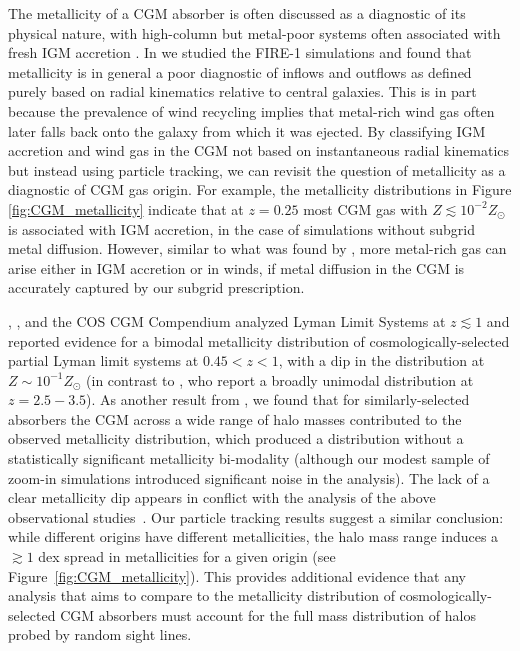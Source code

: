 \documentclass[fleqn,usenatbib]{mnras}
\begin{document}
The metallicity of a CGM absorber is often discussed as a diagnostic of its physical nature, with high-column but metal-poor systems often associated with fresh IGM accretion \citep[e.g.,][]{2011ApJ...743..207R, 2011Sci...334.1245F,Fumagalli2016a}. 
In \cite{Hafen2016} we studied the FIRE-1 simulations and found that metallicity is in general a poor diagnostic of inflows and outflows as defined purely based on radial kinematics relative to central galaxies. 
This is in part because the prevalence of wind recycling implies that metal-rich wind gas often later falls back onto the galaxy from which it was ejected. 
By classifying IGM accretion and wind gas in the CGM not based on instantaneous radial kinematics but instead using particle tracking, we can revisit the question of metallicity as a diagnostic of CGM gas origin. 
For example, the metallicity distributions in Figure \ref{fig:CGM_metallicity} indicate that at $z=0.25$ most CGM gas with $Z \lesssim 10^{-2}Z_\odot$ is associated with IGM accretion, in the case of simulations without subgrid metal diffusion. 
However, similar to what was found by \cite{Hafen2016}, more metal-rich gas can arise either in IGM accretion or in winds, if metal diffusion in the CGM is accurately captured by our subgrid prescription.

\cite{Lehner2013}, \cite{Wotta2016}, and the COS CGM Compendium \citep{Lehner2018,Wotta2018,Lehner2019} analyzed Lyman Limit Systems at $z \lesssim 1$ and reported evidence for a bimodal metallicity distribution of cosmologically-selected partial Lyman limit systems at $0.45 < z < 1$, with a dip in the distribution at $Z\sim10^{-1}Z_\odot$ (in contrast to \citealt{Fumagalli2016}, who report a broadly unimodal distribution at $z=2.5-3.5$).
As another result from \cite{Hafen2016}, we found that for similarly-selected absorbers the CGM across a wide range of halo masses contributed to the observed metallicity distribution, which produced a distribution without a statistically significant metallicity bi-modality (although our modest sample of zoom-in simulations introduced significant noise in the analysis). 
The lack of a clear metallicity dip appears in conflict with the analysis of the above observational studies~\citep[see also][]{Rahmati2018}.
Our particle tracking results suggest a similar conclusion: while different origins have different metallicities, the halo mass range induces a $\gtrsim 1$ dex spread in metallicities for a given origin (see Figure~\ref{fig:CGM_metallicity}).
This provides additional evidence that any analysis that aims to compare to the metallicity distribution of cosmologically-selected CGM absorbers must account for the full mass distribution of halos probed by random sight lines.
\end{document}

